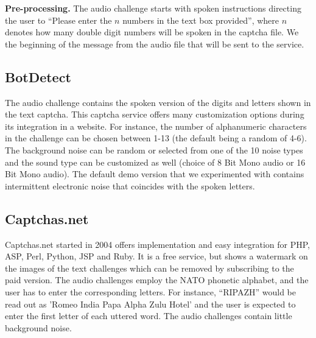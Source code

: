 
\textbf{Pre-processing.} The audio challenge starts with spoken instructions directing the user to 
``Please enter the $n$ numbers in the text box provided'', where $n$ denotes how many double digit numbers will be spoken
in the captcha file. We the beginning of the message from the audio file that will be sent to the service.


\subsection{BotDetect}

The audio challenge contains the spoken version of the digits and letters shown in the text captcha.
This captcha service offers many customization options during its integration in a website. For instance, 
the number of alphanumeric characters in the challenge can be chosen between
1-13 (the default being a random of 4-6). The background noise can be random or selected from one of 
the 10 noise types and the sound type can be customized as well (choice of 8 Bit Mono audio or 16 Bit 
Mono audio). The default demo version that we experimented with contains intermittent electronic noise that 
coincides with the spoken letters.

\subsection{Captchas.net}

Captchas.net started in 2004 offers implementation and easy integration for PHP, ASP, Perl, 
Python, JSP and Ruby. It is a free service, but shows a watermark on the images of the text challenges 
which can be removed by subscribing to the paid version. 
The audio challenges employ the NATO phonetic alphabet, and the user has to enter the corresponding letters.
For instance, ``RIPAZH'' would be read out as 'Romeo India Papa Alpha Zulu Hotel' and the user is expected 
to enter the first letter of each uttered word. The audio challenges contain little background noise.

